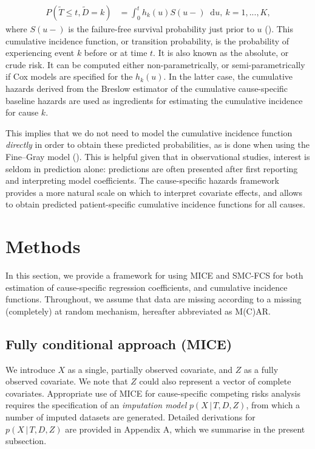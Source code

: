 \documentclass[
  letterpaper,
  DIV=11,
  numbers=noendperiod]{scrreprt}
\newcommand{\given}{\,|\,}
\newcommand\diff{\mathop{}\!\mathrm{d}}
\begin{document}
\begin{align}
    P(\tilde{T} \leq t, \tilde{D} = k) &= \int_{0}^{t}h_k(u)S(u-) \diff u, \ k=1,...,K,
\end{align} where \(S(u-)\) is the failure-free survival probability
just prior to \(u\)
(). This cumulative incidence function, or transition
probability, is the probability of experiencing event \(k\) before or at
time \(t\). It is also known as the absolute, or crude risk. It can be
computed either non-parametrically, or semi-parametrically if Cox models
are specified for the \(h_k(u)\). In the latter case, the cumulative
hazards derived from the Breslow estimator of the cumulative
cause-specific baseline hazards are used as ingredients for estimating
the cumulative incidence for cause \(k\).

This implies that we do not need to model the cumulative incidence
function \emph{directly} in order to obtain these predicted
probabilities, as is done when using the Fine--Gray model
().
This is helpful given that in observational studies, interest is seldom
in prediction alone: predictions are often presented after first
reporting and interpreting model coefficients. The cause-specific
hazards framework provides a more natural scale on which to interpret
covariate effects, and allows to obtain predicted patient-specific
cumulative incidence functions for all causes.

\section{Methods}\label{sec-imp-models}

In this section, we provide a framework for using MICE and SMC-FCS for
both estimation of cause-specific regression coefficients, and
cumulative incidence functions. Throughout, we assume that data are
missing according to a missing (completely) at random mechanism,
hereafter abbreviated as M(C)AR.

\subsection{Fully conditional approach
(MICE)}\label{sec-imp-models-main}

We introduce \(X\) as a single, partially observed covariate, and \(Z\)
as a fully observed covariate. We note that \(Z\) could also represent a
vector of complete covariates. Appropriate use of MICE for
cause-specific competing risks analysis requires the specification of an
\emph{imputation model} \(p(X \given T,D,Z)\), from which a number of
imputed datasets are generated. Detailed derivations for
\(p(X \given T,D,Z)\) are provided in Appendix A, which we summarise in
the present subsection.
\end{document}
